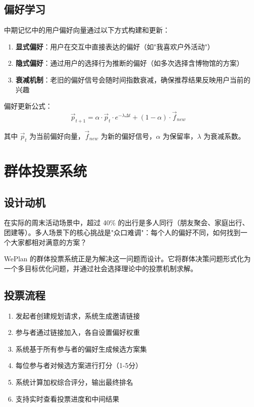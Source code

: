 \documentclass[12pt,a4paper]{ctexart}
\begin{document}
\subsection{偏好学习}

中期记忆中的用户偏好向量通过以下方式构建和更新：

\begin{enumerate}[leftmargin=2em]
  \item \textbf{显式偏好}：用户在交互中直接表达的偏好（如"我喜欢户外活动"）
  \item \textbf{隐式偏好}：通过用户的选择行为推断的偏好（如多次选择含博物馆的方案）
  \item \textbf{衰减机制}：老旧的偏好信号会随时间指数衰减，确保推荐结果反映用户当前的兴趣
\end{enumerate}

偏好更新公式：
\begin{equation}
\vec{p}_{t+1} = \alpha \cdot \vec{p}_t \cdot e^{-\lambda \Delta t} + (1-\alpha) \cdot \vec{f}_{new}
\end{equation}

其中 $\vec{p}_t$ 为当前偏好向量，$\vec{f}_{new}$ 为新的偏好信号，$\alpha$ 为保留率，$\lambda$ 为衰减系数。

\newpage

\section{群体投票系统}

\subsection{设计动机}

在实际的周末活动场景中，超过 40\% 的出行是多人同行（朋友聚会、家庭出行、团建等）。多人场景下的核心挑战是"众口难调"：每个人的偏好不同，如何找到一个大家都相对满意的方案？

WePlan 的群体投票系统正是为解决这一问题而设计。它将群体决策问题形式化为一个多目标优化问题，并通过社会选择理论中的投票机制求解。

\subsection{投票流程}

\begin{enumerate}[leftmargin=2em]
  \item 发起者创建规划请求，系统生成邀请链接
  \item 参与者通过链接加入，各自设置偏好权重
  \item 系统基于所有参与者的偏好生成候选方案集
  \item 每位参与者对候选方案进行打分（1-5分）
  \item 系统计算加权综合评分，输出最终排名
  \item 支持实时查看投票进度和中间结果
\end{enumerate}
\end{document}
